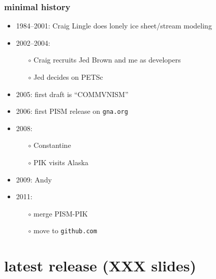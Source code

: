 \documentclass[hide notes,intlimits]{beamer}
\begin{document}
\begin{frame}
  \frametitle{minimal history}
  \begin{itemize}
  \item 1984--2001: Craig Lingle does lonely ice sheet/stream modeling
  \item 2002--2004:
    \begin{itemize}
    \item[$\circ$] Craig recruits Jed Brown and me as developers
    \item[$\circ$] Jed decides on PETSc
    \end{itemize}
  \item 2005: first draft is ``COMMVNISM''
  \item 2006: first PISM release on \texttt{gna.org}
  \item 2008:
    \begin{itemize}
    \item[$\circ$] Constantine
    \item[$\circ$] PIK visits Alaska
    \end{itemize}
  \item 2009: Andy
  \item 2011:
    \begin{itemize}
    \item[$\circ$] merge PISM-PIK
    \item[$\circ$] move to \texttt{github.com}
    \end{itemize}
  \end{itemize}
\end{frame}


\section[latest release]{latest release  (XXX slides)}
\end{document}
